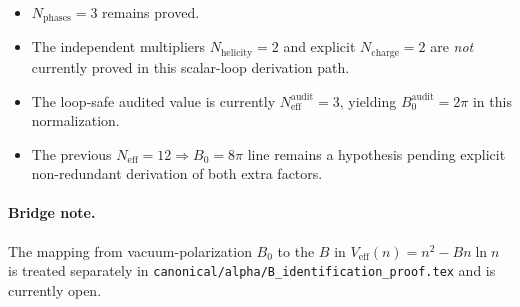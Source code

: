 \documentclass[12pt,a4paper]{article}
\theoremstyle{definition}
\theoremstyle{remark}
\newcommand{\Neff}{N_{\mathrm{eff}}}
\begin{document}
\begin{itemize}
  \item $N_{\mathrm{phases}}=3$ remains proved.
  \item The independent multipliers $N_{\mathrm{helicity}}=2$ and explicit
  $N_{\mathrm{charge}}=2$ are \emph{not} currently proved in this scalar-loop
  derivation path.
  \item The loop-safe audited value is currently
  $N_{\mathrm{eff}}^{\mathrm{audit}}=3$, yielding $B_0^{\mathrm{audit}}=2\pi$ in this
  normalization.
  \item The previous $\Neff=12\Rightarrow B_0=8\pi$ line remains a hypothesis
  pending explicit non-redundant derivation of both extra factors.
\end{itemize}

\paragraph{Bridge note.}
The mapping from vacuum-polarization $B_0$ to the $B$ in
$V_{\mathrm{eff}}(n)=n^2-Bn\ln n$ is treated separately in
\texttt{canonical/alpha/B\_identification\_proof.tex} and is currently open.
\end{document}
